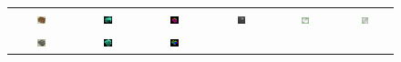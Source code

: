 \documentclass[10pt,journal,cspaper,compsoc]{IEEEtran}
\begin{document}
\begin{figure}[htbp]
\begin{center}
\begin{tabular}{cccccc}
\includegraphics[width=0.15\textwidth]{cu_1.png} &
\includegraphics[width=0.15\textwidth]{cu_2.png} &
\includegraphics[width=0.15\textwidth]{cu_7.png} &
\includegraphics[width=0.15\textwidth]{cu_9.png} &
\includegraphics[width=0.15\textwidth]{cu_11.png} &
\includegraphics[width=0.15\textwidth]{cu_3.png} \\
\includegraphics[width=0.15\textwidth]{health_town_1.png} &
\includegraphics[width=0.15\textwidth]{health_town_2.png} &
\includegraphics[width=0.15\textwidth]{health_town_7.png} &

\end{tabular}
\end{center}
\end{figure}
\end{document}
